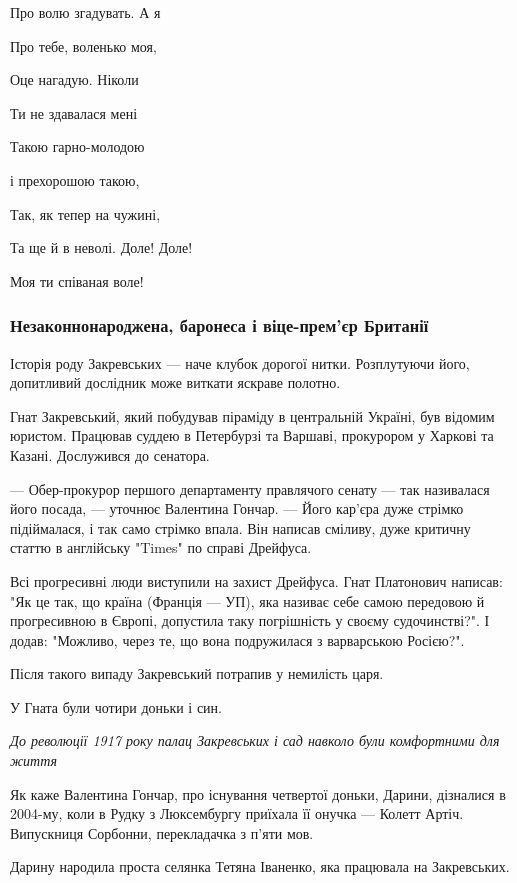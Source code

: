 \begin{multicols}{2}
	\obeycr
	\restorecr
Про волю згадувать. А я

Про тебе, воленько моя,

Оце нагадую. Ніколи

Ти не здавалася мені

Такою гарно-молодою

і прехорошою такою,

Так, як тепер на чужині,

Та ще й в неволі. Доле! Доле!

Моя ти співаная воле!
\end{multicols}

\subsubsection{Незаконнонароджена, баронеса і віце-прем'єр Британії}

Історія роду Закревських --- наче клубок дорогої нитки. Розплутуючи його,
допитливий дослідник може виткати яскраве полотно.

Гнат Закревський, який побудував піраміду в центральній Україні, був відомим
юристом. Працював суддею в Петербурзі  та Варшаві, прокурором у Харкові та
Казані. Дослужився до сенатора.

--- Обер-прокурор першого департаменту правлячого сенату --- так називалася його
посада, --- уточнює Валентина Гончар. --- Його кар'єра дуже стрімко підіймалася, і
так само стрімко впала. Він написав сміливу, дуже критичну статтю в англійську
"Times" по справі Дрейфуса. 

Всі прогресивні люди виступили на захист Дрейфуса. Гнат Платонович написав: "Як
це так, що країна (Франція --- УП), яка називає себе самою передовою й
прогресивною в Європі, допустила таку погрішність у своєму судочинстві?". І
додав: "Можливо, через те, що вона подружилася з варварською Росією?".

Після такого випаду Закревський потрапив у немилість царя.

У Гната були чотири доньки і син. 

\emph{До революції 1917 року палац Закревських і сад навколо були комфортними для життя}

Як каже Валентина Гончар, про існування четвертої доньки, Дарини, дізналися в
2004-му, коли в Рудку з Люксембургу приїхала її онучка --- Колетт Артіч.
Випускниця Сорбонни, перекладачка з п'яти мов.

Дарину народила проста селянка Тетяна Іваненко, яка працювала на Закревських.

